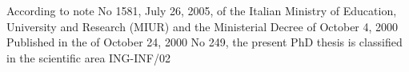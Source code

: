\newpage
\thispagestyle{empty}
\hfill

\vfill
{
\footnotesize{
\noindent According to note No 1581, July 26, 2005, of the Italian Ministry of Education, 
University and Research (MIUR) and the Ministerial Decree of October 4, 2000 
Published in the  of October 24, 2000 No 249,
the present PhD thesis is classified in the scientific area ING-INF/02
}
}
\mbox{}
\newpage


%
%
